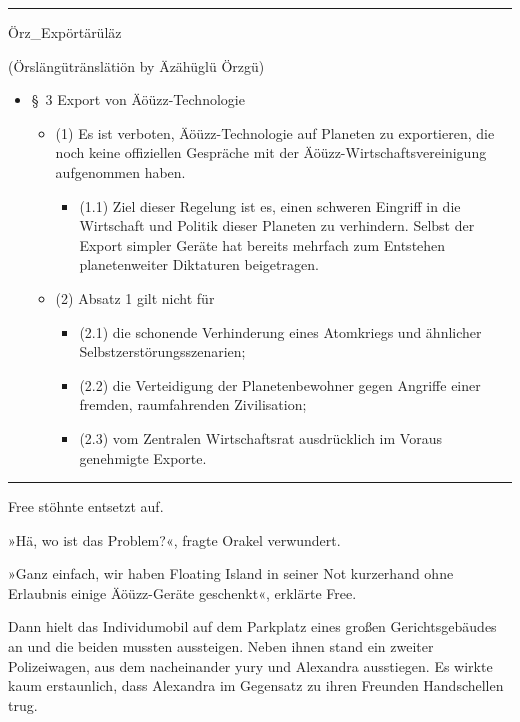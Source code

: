 \noindent \parbox{\textwidth}{ \vspace{3ex} \hrule \vspace{3ex}

\noindent Örz\_Expörtärüläz

\noindent (Örslängütränslätiön by Äzähüglü Örzgü)

\begin{itemize}
\item[] §~3 Export von Äöüzz-Technologie
\begin{itemize}
\item[] (1) Es ist verboten, Äöüzz-Technologie auf Planeten zu exportieren, die noch keine offiziellen Gespräche mit der Äöüzz-Wirtschaftsvereinigung aufgenommen haben.
\begin{itemize}
\item[] (1.1) Ziel dieser Regelung ist es, einen schweren Eingriff in die Wirtschaft und Politik dieser Planeten zu verhindern. Selbst der Export simpler Geräte hat bereits mehrfach zum Entstehen planetenweiter Diktaturen beigetragen.
\end{itemize}
\item[] (2) Absatz 1 gilt nicht für
\begin{itemize}
\item[] (2.1) die schonende Verhinderung eines Atomkriegs und ähnlicher Selbstzerstörungsszenarien;
\item[] (2.2) die Verteidigung der Planetenbewohner gegen Angriffe einer fremden, raumfahrenden Zivilisation;
\item[] (2.3) vom Zentralen Wirtschaftsrat ausdrücklich im Voraus genehmigte Exporte.
\end{itemize}
\end{itemize}
\end{itemize}

\vspace{3ex} \hrule \vspace{3ex} }

Free stöhnte entsetzt auf.

»Hä, wo ist das Problem?«, fragte Orakel verwundert.

»Ganz einfach, wir haben Floating Island in seiner Not kurzerhand ohne Erlaubnis einige Äöüzz-Geräte geschenkt«, erklärte Free.

Dann hielt das Individumobil auf dem Parkplatz eines großen Gerichtsgebäudes an und die beiden mussten aussteigen. Neben ihnen stand ein zweiter Polizeiwagen, aus dem nacheinander yury und Alexandra ausstiegen. Es wirkte kaum erstaunlich, dass Alexandra im Gegensatz zu ihren Freunden Handschellen trug.

